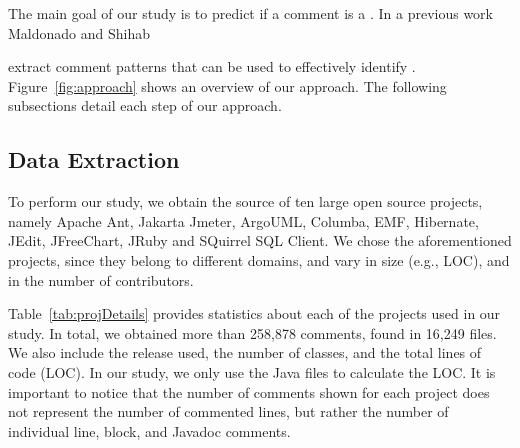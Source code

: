 The main goal of our study is to predict if a comment is a \SADTD. In a previous work Maldonado and Shihab 


extract comment patterns that can be used to effectively identify \SADTD. Figure~\ref{fig:approach} shows an overview of our approach. The following subsections detail each step of our approach.
 
\subsection{Data Extraction}

To perform our study, we obtain the source of ten large open source projects, namely Apache Ant, Jakarta Jmeter, ArgoUML,  Columba, EMF, Hibernate, JEdit, JFreeChart, JRuby and SQuirrel SQL Client. We chose the aforementioned projects, since they belong to different domains, and vary in size (e.g., LOC), and in the number of contributors.

Table~\ref{tab:projDetails} provides statistics about each of the projects used in our study. In total, we obtained more than 258,878 comments, found in 16,249 files. We also include the release used, the number of classes, and the total lines of code (LOC). In our study, we only use the Java files to calculate the LOC. It is important to notice that the number of comments shown for each project does not represent the number of commented lines, but rather the number of individual line, block, and Javadoc comments. 


